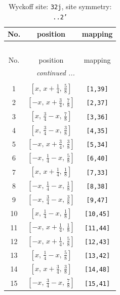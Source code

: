 \documentclass[fleqn,8pt]{jsarticle}
\begin{document}
\begin{longtable}{ccc}
\caption{Wyckoff site: {\tt 32j}, site symmetry: {\tt ..2'}}
 \\
 \hline \hline
No. & position & mapping \\ \hline \endfirsthead

\multicolumn{2}{l}{\tablename\ \thetable{}} \\
 \hline \hline
No. & position & mapping \\ \hline \endhead

 \hline \hline
\multicolumn{2}{r}{\footnotesize\it continued ...} \\ \endfoot

 \hline \hline
\multicolumn{2}{r}{} \\ \endlastfoot

1 & $\left[ x,\, x + \frac{1}{4},\, \frac{5}{8} \right]$ & {\tt [1,39]} \\ \hline
2 & $\left[ - x,\, x + \frac{3}{4},\, \frac{7}{8} \right]$ & {\tt [2,37]} \\ \hline
3 & $\left[ x,\, \frac{3}{4} - x,\, \frac{7}{8} \right]$ & {\tt [3,36]} \\ \hline
4 & $\left[ x,\, \frac{3}{4} - x,\, \frac{3}{8} \right]$ & {\tt [4,35]} \\ \hline
5 & $\left[ - x,\, x + \frac{3}{4},\, \frac{3}{8} \right]$ & {\tt [5,34]} \\ \hline
6 & $\left[ - x,\, \frac{1}{4} - x,\, \frac{5}{8} \right]$ & {\tt [6,40]} \\ \hline
7 & $\left[ x,\, x + \frac{1}{4},\, \frac{1}{8} \right]$ & {\tt [7,33]} \\ \hline
8 & $\left[ - x,\, \frac{1}{4} - x,\, \frac{1}{8} \right]$ & {\tt [8,38]} \\ \hline
9 & $\left[ - x,\, \frac{3}{4} - x,\, \frac{3}{8} \right]$ & {\tt [9,47]} \\ \hline
10 & $\left[ x,\, \frac{1}{4} - x,\, \frac{1}{8} \right]$ & {\tt [10,45]} \\ \hline
11 & $\left[ - x,\, x + \frac{1}{4},\, \frac{1}{8} \right]$ & {\tt [11,44]} \\ \hline
12 & $\left[ - x,\, x + \frac{1}{4},\, \frac{5}{8} \right]$ & {\tt [12,43]} \\ \hline
13 & $\left[ x,\, \frac{1}{4} - x,\, \frac{5}{8} \right]$ & {\tt [13,42]} \\ \hline
14 & $\left[ x,\, x + \frac{3}{4},\, \frac{3}{8} \right]$ & {\tt [14,48]} \\ \hline
15 & $\left[ - x,\, \frac{3}{4} - x,\, \frac{7}{8} \right]$ & {\tt [15,41]} \\ \hline

\end{longtable}
\end{document}
